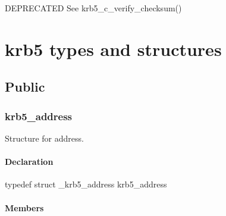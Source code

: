\documentclass[letterpaper,10pt,english]{sphinxmanual}
\begin{document}
DEPRECATED See krb5\_c\_verify\_checksum()


\section{krb5 types and structures}
\label{appdev/refs/types/index::doc}\label{appdev/refs/types/index:krb5-types-and-structures}

\subsection{Public}
\label{appdev/refs/types/index:public}

\subsubsection{krb5\_address}
\label{appdev/refs/types/krb5_address:krb5-address-struct}\label{appdev/refs/types/krb5_address::doc}\label{appdev/refs/types/krb5_address:krb5-address}

\begin{fulllineitems}
\label{appdev/refs/types/krb5_address:c.krb5_address}
\end{fulllineitems}


Structure for address.


\paragraph{Declaration}
\label{appdev/refs/types/krb5_address:declaration}
typedef struct \_krb5\_address  krb5\_address


\paragraph{Members}
\label{appdev/refs/types/krb5_address:members}

\begin{fulllineitems}
\label{appdev/refs/types/krb5_address:c.krb5_address.magic}
\end{fulllineitems}


\begin{fulllineitems}
\label{appdev/refs/types/krb5_address:c.krb5_address.addrtype}
\end{fulllineitems}
\end{document}
